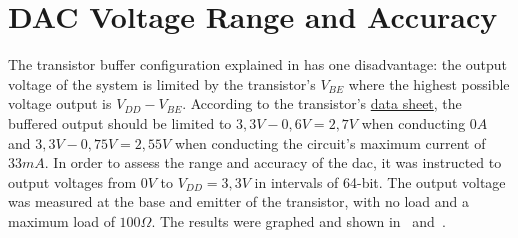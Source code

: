 \section{DAC Voltage Range and Accuracy}\label{sec:dac-voltage-range-and-accuracy}

The transistor buffer configuration explained in  has one disadvantage: the output voltage of the system is limited by the transistor's $V_{BE}$ where the highest possible voltage output is $V_{DD} - V_{BE}$.
According to the transistor's \href{https://www.lcsc.com/datasheet/lcsc_datasheet_2310131500_Jiangsu-Changjing-Electronics-Technology-Co---Ltd--S8050-J3Y-RANGE-200-350_C2146.pdf}{data sheet}, the buffered output should be limited to $3,3V - 0,6V = 2,7V$ when conducting $0A$ and $3,3V - 0,75V = 2,55V$ when conducting the circuit's maximum current of $33mA$.
In order to assess the range and accuracy of the \gls{dac}, it was instructed to output voltages from $0V$ to $V_{DD} = 3,3V$ in intervals of 64-bit. 
The output voltage was measured at the base and emitter of the transistor, with no load and a maximum load of $100\Omega$.
The results were graphed and shown in~ and~.

